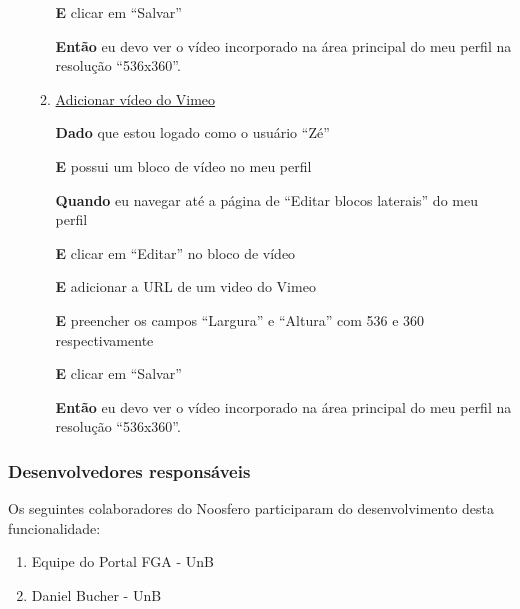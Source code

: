 \begin{enumerate}
\begin{enumerate}
\textbf{E} clicar em ``Salvar''

\textbf{Então} eu devo ver o vídeo incorporado na área principal do meu
perfil na resolução ``536x360''.



\item \underline{Adicionar vídeo do Vimeo}

\textbf{Dado} que estou logado como o usuário ``Zé''

\textbf{E} possui um bloco de vídeo no meu perfil

\textbf{Quando} eu navegar até a página de ``Editar blocos laterais'' do meu perfil

\textbf{E} clicar em ``Editar'' no bloco de vídeo

\textbf{E} adicionar a URL de um video do Vimeo

\textbf{E} preencher os campos ``Largura'' e ``Altura'' com 536 e 360
respectivamente

\textbf{E} clicar em ``Salvar''

\textbf{Então} eu devo ver o vídeo incorporado na área principal do meu
perfil na resolução ``536x360''.

\end{enumerate}

\end{enumerate}

\subsubsection*{Desenvolvedores responsáveis}

Os seguintes colaboradores do Noosfero participaram do desenvolvimento desta
funcionalidade:

\begin{enumerate}

\item Equipe do Portal FGA - UnB

\item Daniel Bucher - UnB

\end{enumerate}


